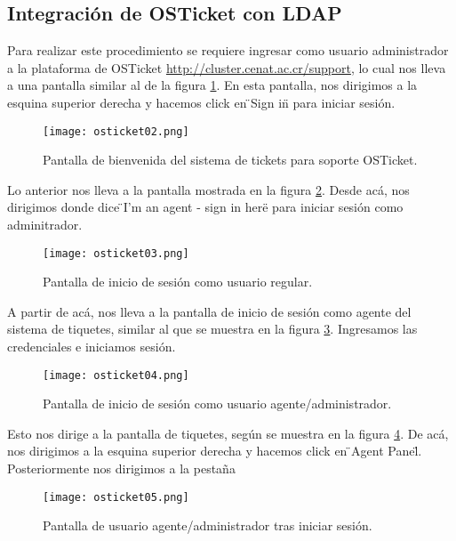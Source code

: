 \subsection{Integración de OSTicket con LDAP}
Para realizar este procedimiento se requiere ingresar como usuario administrador a la plataforma de OSTicket \url{http://cluster.cenat.ac.cr/support}, lo cual nos lleva a una pantalla similar al de la figura \ref{fig:osticket:02}. En esta pantalla, nos dirigimos a la esquina superior derecha y hacemos click en \"{}Sign in\"{} para iniciar sesión.  
\begin{figure}[H]
\centering
\texttt{[image: osticket02.png]}
\caption{Pantalla de bienvenida del sistema de tickets para soporte OSTicket.}
\label{fig:osticket:02}
\end{figure}
Lo anterior nos lleva a la pantalla mostrada en la figura \ref{fig:osticket:03}. Desde acá, nos dirigimos donde dice \"{}I'm an agent - sign in here\"{} para iniciar sesión como adminitrador.
\begin{figure}[H]
\centering
\texttt{[image: osticket03.png]}
\caption{Pantalla de inicio de sesión como usuario regular.}
\label{fig:osticket:03}
\end{figure}
A partir de acá, nos lleva a la pantalla de inicio de sesión como agente del sistema de tiquetes, similar al que se muestra en la figura \ref{fig:osticket:04}. Ingresamos las credenciales e iniciamos sesión.
\begin{figure}[H]
\centering
\texttt{[image: osticket04.png]}
\caption{Pantalla de inicio de sesión como usuario agente/administrador.}
\label{fig:osticket:04}
\end{figure}
Esto nos dirige a la pantalla de tiquetes, según se muestra en la figura \ref{fig:osticket:05}. De acá, nos dirigimos a la esquina superior derecha y hacemos click en \"{}Agent Panel\"{}. Posteriormente nos dirigimos a la pestaña 
\begin{figure}[H]
\centering
\texttt{[image: osticket05.png]}
\caption{Pantalla de usuario agente/administrador tras iniciar sesión.}
\label{fig:osticket:05}
\end{figure}
